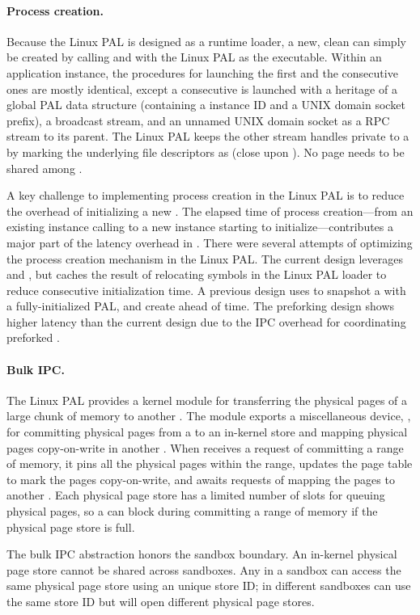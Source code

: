 \paragraph{Process creation.}
Because the Linux PAL is designed as a runtime loader,
a new, clean \picoproc{} can simply be created by calling  and  with the Linux PAL as the executable.
Within an application instance, the procedures for launching the first \picoproc{} and the consecutive ones
are mostly identical,
except a consecutive \picoproc{} is launched with a heritage of a global PAL data structure (containing a \graphene{} instance ID and a UNIX domain socket prefix), a broadcast stream,
and an unnamed UNIX domain socket as a RPC stream to its parent.
The Linux PAL keeps the other stream handles private to a \picoproc{}
by marking the underlying file descriptors
as  (close upon ).
No page needs to be shared among \picoprocs{}.


A key challenge to implementing process creation in the Linux PAL
is to reduce the overhead
of initializing a new \picoproc{}.
The elapsed time of process creation---from an existing \thelibos{} instance calling  to a new \thelibos{} instance starting to initialize---contributes a major part of the  latency overhead
in \graphene{}.
There were several attempts of optimizing the process creation mechanism
in the Linux PAL.
The current design leverages  and ,
but caches the result of relocating symbols in the Linux PAL loader to reduce consecutive \picoproc{} initialization time.
A previous design
uses  to snapshot a \picoproc{} with a fully-initialized PAL,
and create \picoprocs{} ahead of time.
The preforking design shows higher latency than the current design
due to the IPC overhead for coordinating preforked \picoprocs{}.




\paragraph{Bulk IPC.}
The Linux PAL provides a  kernel module for
transferring the physical pages of a large chunk of memory to another \picoproc{}. 
The  module exports a miscellaneous device, , for committing physical pages from a \picoproc{} to an in-kernel store and mapping physical pages copy-on-write in another \picoproc{}.
When  receives
a request of committing a range of memory, it pins all the physical pages within the range,
updates the page table to mark the pages copy-on-write,
and awaits requests of mapping the pages to another \picoproc{}.
Each physical page store has a limited number of slots for queuing physical pages,
so a \picoproc{} can block during committing a range of memory
if the physical page store is full.


The bulk IPC abstraction honors the sandbox boundary. An in-kernel physical page store cannot be shared across sandboxes.
Any \picoprocs{} in a sandbox
can access the same physical page store using an unique store ID;
\picoprocs{} in different sandboxes can
use the same store ID but will open different physical page stores.


